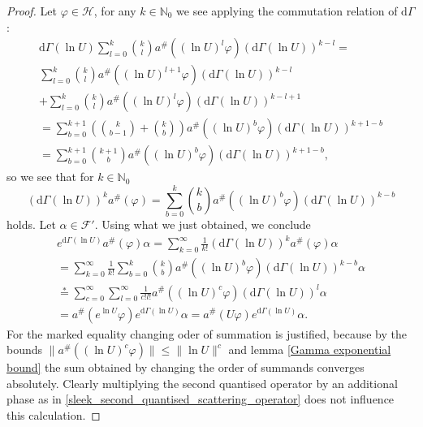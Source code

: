 \documentclass[b5paper,draft,openbib,12pt]{memoir}
\begin{document}
\begin{proof}
Let \(\varphi\in \mathcal{H}\), for any \(k\in \mathbb{N}_0\) we see applying the commutation relation of \(\mathrm{d}\Gamma\):
\begin{multline*}
\mathrm{d}\Gamma(\ln U) \sum_{l=0}^k \binom{k}{l} a^\# \left(\left(\ln U\right)^l \varphi \right) \left(\mathrm{d}\Gamma(\ln U)\right)^{k-l} = \\
\sum_{l=0}^k \binom{k}{l} a^\# \left(\left(\ln U\right)^{l+1} \varphi \right) \left(\mathrm{d}\Gamma(\ln U)\right)^{k-l}\\
+\sum_{l=0}^k \binom{k}{l} a^\# \left(\left(\ln U\right)^l \varphi \right) \left(\mathrm{d}\Gamma(\ln U)\right)^{k-l+1}\\
= \sum_{b=0}^{k+1} \left( \binom{k}{b-1} + \binom{k}{b}\right) a^\#\left( (\ln U)^b \varphi\right) \left( \mathrm{d}\Gamma(\ln U)\right)^{k+1-b}\\
=\sum_{b=0}^{k+1}  \binom{k+1}{b}  a^\#\left( (\ln U)^b \varphi\right) \left( \mathrm{d}\Gamma(\ln U)\right)^{k+1-b},
\end{multline*}
so we see that for \(k\in\mathbb{N}_0\)
\begin{equation}
\left(\mathrm{d}\Gamma(\ln U)\right)^k a^\# (\varphi) = \sum_{b=0}^{k}  \binom{k}{b}  a^\#\left( (\ln U)^b \varphi\right) \left( \mathrm{d}\Gamma(\ln U)\right)^{k-b}
\end{equation}
holds. Let \(\alpha \in \mathcal{F}'\). Using what we just obtained, we conclude
\begin{multline*}
e^{\mathrm{d}\Gamma(\ln U)}a^\#(\varphi) \alpha = \sum_{k=0}^\infty \frac{1}{k!} \left(\mathrm{d}\Gamma(\ln U)\right)^k a^\# (\varphi)\alpha\\
=\sum_{k=0}^\infty \frac{1}{k!}  \sum_{b=0}^{k}  \binom{k}{b}  a^\#\left( (\ln U)^b \varphi \right) \left( \mathrm{d}\Gamma(\ln U)\right)^{k-b}\alpha\\
\overset{*}{=}\sum_{c=0}^\infty \sum_{l=0}^\infty \frac{1}{c! l!} a^\#\left( (\ln U)^c \varphi \right) \left( \mathrm{d}\Gamma(\ln U)\right)^{l}\alpha\\
=a^\#\left( e^{\ln U} \varphi \right) e^{\mathrm{d}\Gamma( \ln U)}\alpha
=a^\#\left( U \varphi \right) e^{\mathrm{d}\Gamma( \ln U)}\alpha.
\end{multline*}
For the marked equality changing oder of summation is justified, because by the bounds
 \(\|a^\#((\ln U)^c \varphi)\|\le \|\ln U\|^c\) and  lemma \ref{Gamma exponential bound} the sum obtained by changing the order
 of summands converges absolutely.
Clearly multiplying the second quantised operator by an additional phase as in 
\eqref{sleek_second_quantised_scattering_operator} does not influence this calculation.
\end{proof}
\end{document}
